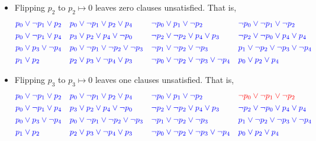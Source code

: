 \documentclass[11pt,a4paper]{article}
\begin{document}
\begin{itemize}
\item Flipping $p_2$ to $p_2 \mapsto 0$ leaves zero clauses unsatisfied. That is,
\begin{align*}
&\textcolor{blue}{p_0 \lor \neg p_1 \lor p_2} & & \textcolor{blue}{p_0 \lor \neg p_1 \lor p_2 \lor p_4} & & \textcolor{blue}{\neg p_0 \lor p_1 \lor \neg p_2} & & \textcolor{blue}{\neg p_0 \lor \neg p_1 \lor \neg p_2} \\
&\textcolor{blue}{ p_0 \lor \neg p_1 \lor p_4} && \textcolor{blue}{p_3 \lor p_2 \lor p_4 \lor \neg p_0} && \textcolor{blue}{\neg p_2 \lor \neg p_2 \lor p_4 \lor p_3} && \textcolor{blue}{\neg p_2 \lor \neg p_0 \lor p_4 \lor p_4} \\
& \textcolor{blue}{p_0 \lor p_3 \lor \neg p_4} && \textcolor{blue}{p_0 \lor \neg p_1 \lor \neg p_2 \lor \neg p_3} && \textcolor{blue}{\neg p_1 \lor \neg p_2 \lor \neg p_3} && \textcolor{blue}{p_1 \lor \neg p_2 \lor \neg p_3 \lor \neg p_4} \\
& \textcolor{blue}{p_1 \lor p_2} && \textcolor{blue}{p_2 \lor p_3 \lor \neg p_4 \lor p_3} && \textcolor{blue}{\neg p_0 \lor \neg p_2 \lor \neg p_3 \lor \neg p_4} && \textcolor{blue}{p_0 \lor p_2 \lor p_4} \\
\end{align*}
\item Flipping $p_3$ to $p_3 \mapsto 0$ leaves one clauses unsatisfied. That is,
\begin{align*}
&\textcolor{blue}{p_0 \lor \neg p_1 \lor p_2} & & \textcolor{blue}{p_0 \lor \neg p_1 \lor p_2 \lor p_4} & & \textcolor{blue}{\neg p_0 \lor p_1 \lor \neg p_2} & & \textcolor{red}{\neg p_0 \lor \neg p_1 \lor \neg p_2} \\
&\textcolor{blue}{ p_0 \lor \neg p_1 \lor p_4} && \textcolor{blue}{p_3 \lor p_2 \lor p_4 \lor \neg p_0} && \textcolor{blue}{\neg p_2 \lor \neg p_2 \lor p_4 \lor p_3} && \textcolor{blue}{\neg p_2 \lor \neg p_0 \lor p_4 \lor p_4} \\
& \textcolor{blue}{p_0 \lor p_3 \lor \neg p_4} && \textcolor{blue}{p_0 \lor \neg p_1 \lor \neg p_2 \lor \neg p_3} && \textcolor{blue}{\neg p_1 \lor \neg p_2 \lor \neg p_3} && \textcolor{blue}{p_1 \lor \neg p_2 \lor \neg p_3 \lor \neg p_4} \\
& \textcolor{blue}{p_1 \lor p_2} && \textcolor{blue}{p_2 \lor p_3 \lor \neg p_4 \lor p_3} && \textcolor{blue}{\neg p_0 \lor \neg p_2 \lor \neg p_3 \lor \neg p_4} && \textcolor{blue}{p_0 \lor p_2 \lor p_4} \\
\end{align*}




\end{itemize}
\end{document}
